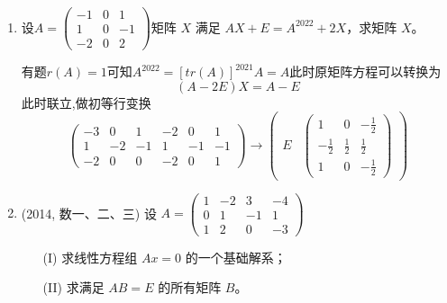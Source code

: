 \documentclass[12pt, a4paper, oneside, UTF8]{ctexbook}
\begin{document}
\begin{enumerate}
    \item 设$A=\begin{pmatrix}
        -1 & 0 & 1\\
        1 & 0 & -1 \\
        -2 & 0 & 2
    \end{pmatrix}$矩阵 $X$ 满足 $AX + E = A^{2022} + 2X$，求矩阵 $X$。
    
    \begin{solution}
    有题$r(A)=1$可知$A^{2022}=[tr(A)]^{2021}A=A$此时原矩阵方程可以转换为
    $$
    (A-2E)X=A-E
    $$
    此时联立,做初等行变换 
    $$
    \begin{pmatrix}
        -3 & 0 & 1 & -2 & 0 & 1 \\
        1 & -2 & -1 & 1 & -1 & -1 \\
        -2 & 0 & 0 & -2 & 0 & 1
    \end{pmatrix} \rightarrow \begin{pmatrix}
        E & \begin{pmatrix}
            1 & 0 & -\frac{1}{2} \\
            -\frac{1}{2}  & \frac{1}{2} & \frac{1}{2} \\
            1 & 0 & -\frac{1}{2}
        \end{pmatrix}
    \end{pmatrix}
    $$
    \end{solution}
    
    \item (2014, 数一、二、三) 设 
    $
    A = \begin{pmatrix}
    1 & -2 & 3 & -4 \\
    0 & 1 & -1 & 1 \\
    1 & 2 & 0 & -3
    \end{pmatrix}
    $
    \begin{enumerate}
        \item [(I)] 求线性方程组 $Ax = 0$ 的一个基础解系；
        \item [(II)] 求满足 $AB = E$ 的所有矩阵 $B$。
    \end{enumerate}
    

\end{enumerate}
\end{document}
